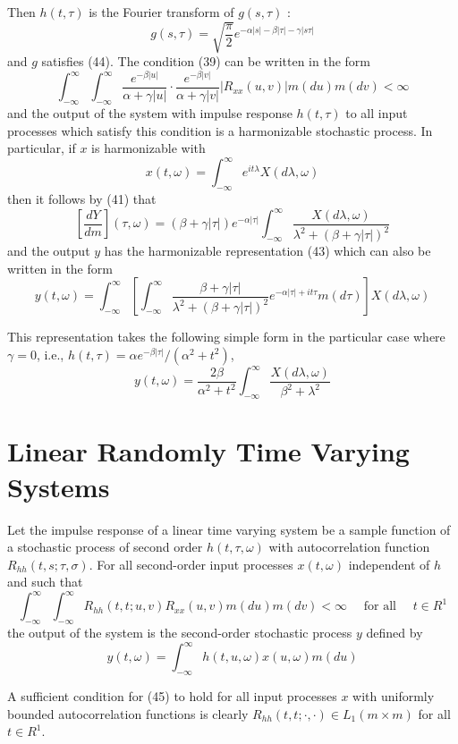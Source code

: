 \documentclass{article}
\begin{document}
Then $h(t, \tau)$ is the Fourier transform of $g(s, \tau)$ :
\[
g(s, \tau)=\sqrt{\frac{\pi}{2}} e^{-\alpha|s|-\beta|\tau|-\gamma|s \tau|}
\]
and $g$ satisfies (44). The condition (39) can be written in the form
\[
\int_{-\infty}^{\infty} \int_{-\infty}^{\infty} \frac{e^{-\beta|u|}}{\alpha+\gamma|u|} \cdot \frac{e^{-\beta|v|}}{\alpha+\gamma|v|}|R_{x x}(u, v)| m(d u) m(d v)<\infty
\]
and the output of the system with impulse response $h(t, \tau)$ to all input processes which satisfy this condition is a harmonizable stochastic process. In particular, if $x$ is harmonizable with
\[
x(t, \omega)=\int_{-\infty}^{\infty} e^{i t \lambda} X(d \lambda, \omega)
\]
then it follows by (41) that
\[
\left[\frac{d Y}{d m}\right](\tau, \omega)=(\beta+\gamma|\tau|) e^{-\alpha|\tau|} \int_{-\infty}^{\infty} \frac{X(d \lambda, \omega)}{\lambda^{2}+(\beta+\gamma|\tau|)^{2}}
\]
and the output $y$ has the harmonizable representation (43) which can also be written in the form
\[
y(t, \omega)=\int_{-\infty}^{\infty}\left[\int_{-\infty}^{\infty} \frac{\beta+\gamma|\tau|}{\lambda^{2}+(\beta+\gamma|\tau|)^{2}} e^{-\alpha|\tau|+i t \tau} m(d \tau)\right] X(d \lambda, \omega)
\]

This representation takes the following simple form in the particular case where $\gamma=0$, i.e., $h(t, \tau)=\alpha e^{-\beta|\tau|}/(\alpha^{2}+t^{2})$,
\[
y(t, \omega)=\frac{2 \beta}{\alpha^{2}+t^{2}} \int_{-\infty}^{\infty} \frac{X(d \lambda, \omega)}{\beta^{2}+\lambda^{2}}
\]

\section*{Linear Randomly Time Varying Systems}

Let the impulse response of a linear time varying system be a sample function of a stochastic process of second order $h(t, \tau, \omega)$ with autocorrelation function $R_{h h}(t, s ; \tau, \sigma)$. For all second-order input processes $x(t, \omega)$ independent of $h$ and such that
\[
\int_{-\infty}^{\infty} \int_{-\infty}^{\infty} R_{h h}(t, t ; u, v) R_{x x}(u, v) m(d u) m(d v)<\infty \quad \text{ for all } \quad t \in R^{1}
\]
the output of the system is the second-order stochastic process $y$ defined by
\[
y(t, \omega)=\int_{-\infty}^{\infty} h(t, u, \omega) x(u, \omega) m(d u)
\]

A sufficient condition for (45) to hold for all input processes $x$ with uniformly bounded autocorrelation functions is clearly $R_{h h}(t, t ; \cdot, \cdot) \in L_{1}(m \times m)$ for all $t \in R^{1}$.
\end{document}
